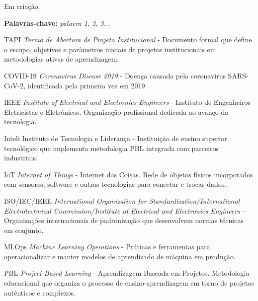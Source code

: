 \documentclass[12pt, a4paper, oneside, brazilian]{abntex2}
\begin{document}
\imprimircapa
\imprimirfolhaderosto

\begin{resumo}
\begin{singlespace}
Em criação.

\vspace{\onelineskip}
\noindent
\textbf{Palavras-chave:} \textit{palavra 1, 2, 3...}
\end{singlespace}
\end{resumo}

\begin{glossary}
\item[TAPI] \textit{Termo de Abertura de Projeto Institucional} - Documento formal que define o escopo, objetivos e parâmetros iniciais de projetos institucionais em metodologias ativas de aprendizagem.

\item[COVID-19] \textit{Coronavirus Disease 2019} - Doença causada pelo coronavírus SARS-CoV-2, identificada pela primeira vez em 2019.

\item[IEEE] \textit{Institute of Electrical and Electronics Engineers} - Instituto de Engenheiros Eletricistas e Eletrônicos. Organização profissional dedicada ao avanço da tecnologia.

\item[Inteli] Instituto de Tecnologia e Liderança - Instituição de ensino superior tecnológico que implementa metodologia PBL integrada com parceiros industriais.

\item[IoT] \textit{Internet of Things} - Internet das Coisas. Rede de objetos físicos incorporados com sensores, software e outras tecnologias para conectar e trocar dados.

\item[ISO/IEC/IEEE] \textit{International Organization for Standardization/International Electrotechnical Commission/Institute of Electrical and Electronics Engineers} - Organizações internacionais de padronização que desenvolvem normas técnicas em conjunto.

\item[MLOps] \textit{Machine Learning Operations} - Práticas e ferramentas para operacionalizar e manter modelos de aprendizado de máquina em produção.

\item[PBL] \textit{Project-Based Learning} - Aprendizagem Baseada em Projetos. Metodologia educacional que organiza o processo de ensino-aprendizagem em torno de projetos autênticos e complexos.
\end{glossary}
\end{document}
